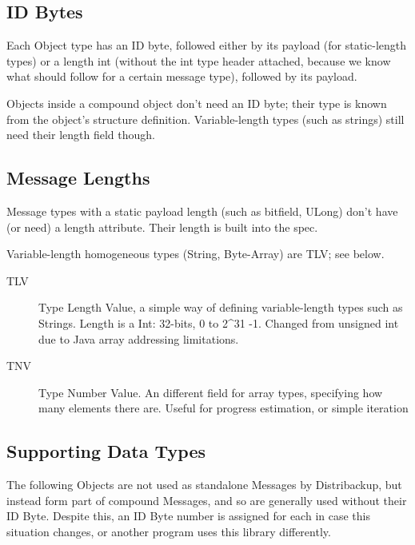 \documentclass[12pt,a4paper,]{adreport}
\begin{document}
\subsection{ID Bytes}\label{id-bytes}

Each Object type has an ID byte, followed either by its payload (for
static-length types) or a length int (without the int type header
attached, because we know what should follow for a certain message
type), followed by its payload.

Objects inside a compound object don't need an ID byte; their type is
known from the object's structure definition. Variable-length types
(such as strings) still need their length field though.

\subsection{Message Lengths}\label{message-lengths}

Message types with a static payload length (such as bitfield, ULong)
don't have (or need) a length attribute. Their length is built into the
spec.

Variable-length homogeneous types (String, Byte-Array) are TLV; see
below.

\begin{description}
\item[TLV]
Type Length Value, a simple way of defining variable-length types such
as Strings. Length is a Int: 32-bits, 0 to 2\^{}31 -1. Changed from
unsigned int due to Java array addressing limitations.
\item[TNV]
Type Number Value. An different field for array types, specifying how
many elements there are. Useful for progress estimation, or simple
iteration
\end{description}

\subsection{Supporting Data Types}\label{supporting-data-types}

The following Objects are not used as standalone Messages by
Distribackup, but instead form part of compound Messages, and so are
generally used without their ID Byte. Despite this, an ID Byte number is
assigned for each in case this situation changes, or another program
uses this library differently.
\end{document}
